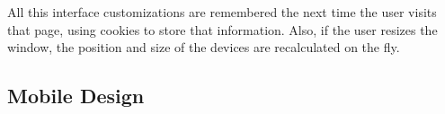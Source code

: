 All this interface customizations are remembered the next time the user visits that page, using cookies to store that information.
Also, if the user resizes the window, the position and size of the devices are recalculated on the fly.


\subsection{Mobile Design} %
\label{sub:mobile_design}


